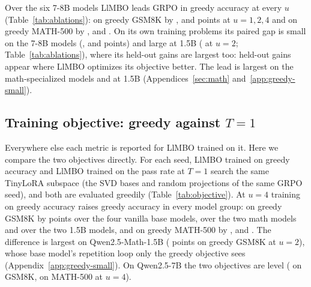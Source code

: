 \documentclass[twoside]{article}
\newcommand{\llmbo}{LlMBO}
\begin{document}
\begin{table}[!htbp]
\centering
\caption{Paired gaps (points) per $u \le 4$, pooled over the six 7-8B base and math models and over the two Qwen2.5 1.5B models (row blocks; each model counted once), mean $\pm$ s.e.\ over seed pairs, in avg@4 and greedy accuracy (sub-columns), \llmbo{} trained on the metric of each column. Left: \llmbo{} $-$ GRPO; \emph{train tier}: greedy accuracy on up to 1024 problems of each model's training tier, the quantity \llmbo{} maximizes there (evaluated in greedy only). Right: the $b = 4$ ablation of \llmbo{} against $b = 1$ (Appendix~\ref{sec:parallel}). Tint: sign and size of the gap (green: the first term ahead).}
\label{tab:ablations}
\renewcommand{\arraystretch}{0.85}
\resizebox{\linewidth}{!}{}
\end{table}

Over the six 7-8B models \llmbo{} leads GRPO in greedy accuracy at every $u$ (Table~\ref{tab:ablations}): on greedy GSM8K by \poolGreedyGreedyUOneGsm{}, \poolGreedyGreedyUTwoGsm{} and \poolGreedyGreedyUFourGsm{} points at $u = 1, 2, 4$ and on greedy MATH-500 by \poolGreedyGreedyUOneMathFive{}, \poolGreedyGreedyUTwoMathFive{} and \poolGreedyGreedyUFourMathFive{}. On its own training problems its paired gap is small on the 7-8B models (\trainGapGreedyUOne{}, \trainGapGreedyUTwo{} and \trainGapGreedyUFour{} points) and large at 1.5B (\trainGapGreedyUTwoSmall{} at $u = 2$; Table~\ref{tab:ablations}), where its held-out gains are largest too: held-out gains appear where \llmbo{} optimizes its objective better.
The lead is largest on the math-specialized models and at 1.5B (Appendices~\ref{sec:math} and~\ref{app:greedy-small}).

\FloatBarrier
\subsection{Training objective: greedy against $T = 1$}
\label{app:objective}

Everywhere else each metric is reported for \llmbo{} trained on it. Here we compare the two objectives directly. For each seed, \llmbo{} trained on greedy accuracy and \llmbo{} trained on the pass rate at $T = 1$ search the same TinyLoRA subspace (the SVD bases and random projections of the same GRPO seed), and both are evaluated greedily (Table~\ref{tab:objective}).
At $u = 4$ training on greedy accuracy raises greedy accuracy in every model group: on greedy GSM8K by \objectiveUFourGsmBase{} points over the four vanilla base models, \objectiveUFourGsmMathVariants{} over the two math models and \objectiveUFourGsmSmall{} over the two 1.5B models, and on greedy MATH-500 by \objectiveUFourMathFiveBase{}, \objectiveUFourMathFiveMathVariants{} and \objectiveUFourMathFiveSmall{}. The difference is largest on Qwen2.5-Math-1.5B (\objectiveMathSmallUTwoGsm{} points on greedy GSM8K at $u = 2$), whose base model's repetition loop only the greedy objective sees (Appendix~\ref{app:greedy-small}). On Qwen2.5-7B the two objectives are level (\objectiveQwenUFourGsm{} on GSM8K, \objectiveQwenUFourMathFive{} on MATH-500 at $u = 4$).
\end{document}
